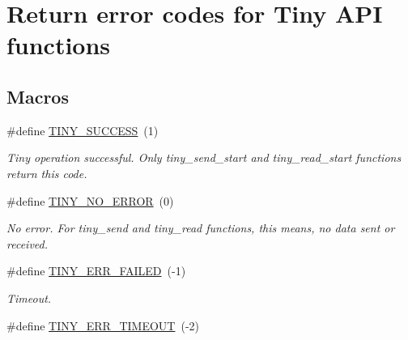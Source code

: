 \hypertarget{group__ERROR__FLAGS}{}\section{Return error codes for Tiny A\+P\+I functions}
\label{group__ERROR__FLAGS}
\subsection*{Macros}
\begin{DoxyCompactItemize}
\item 
\hypertarget{group__ERROR__FLAGS_ga16cd043c890ed1fa381b3a20f75a626c}{}\#define \hyperlink{group__ERROR__FLAGS_ga16cd043c890ed1fa381b3a20f75a626c}{T\+I\+N\+Y\+\_\+\+S\+U\+C\+C\+E\+S\+S}~(1)\label{group__ERROR__FLAGS_ga16cd043c890ed1fa381b3a20f75a626c}

\begin{DoxyCompactList}\small\item\em Tiny operation successful. Only tiny\+\_\+send\+\_\+start and tiny\+\_\+read\+\_\+start functions return this code. \end{DoxyCompactList}\item 
\hypertarget{group__ERROR__FLAGS_ga69c869a686b67bf0b7b8115599515d61}{}\#define \hyperlink{group__ERROR__FLAGS_ga69c869a686b67bf0b7b8115599515d61}{T\+I\+N\+Y\+\_\+\+N\+O\+\_\+\+E\+R\+R\+O\+R}~(0)\label{group__ERROR__FLAGS_ga69c869a686b67bf0b7b8115599515d61}

\begin{DoxyCompactList}\small\item\em No error. For tiny\+\_\+send and tiny\+\_\+read functions, this means, no data sent or received. \end{DoxyCompactList}\item 
\hypertarget{group__ERROR__FLAGS_ga84e6ca143550038e1a71cf36078d1926}{}\#define \hyperlink{group__ERROR__FLAGS_ga84e6ca143550038e1a71cf36078d1926}{T\+I\+N\+Y\+\_\+\+E\+R\+R\+\_\+\+F\+A\+I\+L\+E\+D}~(-\/1)\label{group__ERROR__FLAGS_ga84e6ca143550038e1a71cf36078d1926}

\begin{DoxyCompactList}\small\item\em Timeout. \end{DoxyCompactList}\item 
\hypertarget{group__ERROR__FLAGS_gac9ba8076a1eb8613e8d1f07629ff0cd1}{}\#define \hyperlink{group__ERROR__FLAGS_gac9ba8076a1eb8613e8d1f07629ff0cd1}{T\+I\+N\+Y\+\_\+\+E\+R\+R\+\_\+\+T\+I\+M\+E\+O\+U\+T}~(-\/2)\label{group__ERROR__FLAGS_gac9ba8076a1eb8613e8d1f07629ff0cd1}


\end{DoxyCompactItemize}
